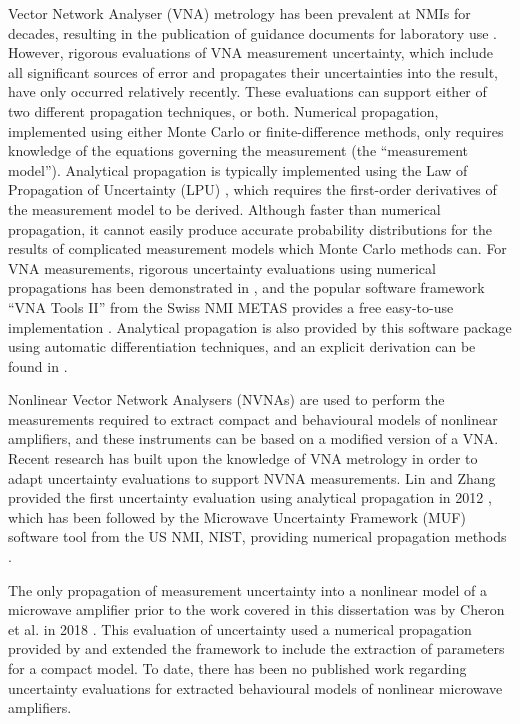 \documentclass[../thesis/thesis.tex]{subfiles}
\begin{document}
Vector Network Analyser (VNA) metrology has been prevalent at NMIs for decades, resulting in the publication of guidance documents for laboratory use \cite{EA_2000,EURAMET_2011}. However, rigorous evaluations of VNA measurement uncertainty, which include all significant sources of error and propagates their uncertainties into the result, have only occurred relatively recently. These evaluations can support either of two different propagation techniques, or both. Numerical propagation, implemented using either Monte Carlo or finite-difference methods, only requires knowledge of the equations governing the measurement (the ``measurement model''). Analytical propagation is typically implemented using the Law of Propagation of Uncertainty (LPU) \cite{GUM_2008}, which requires the first-order derivatives of the measurement model to be derived. Although faster than numerical propagation, it cannot easily produce accurate probability distributions for the results of complicated measurement models which Monte Carlo methods can. For VNA measurements, rigorous uncertainty evaluations using numerical propagations has been demonstrated in \cite{Hoffman_2007}, and the popular software framework ``VNA Tools II'' from the Swiss NMI METAS provides a free easy-to-use implementation \cite{VNATools}. Analytical propagation is also provided by this software package using automatic differentiation techniques, and an explicit derivation can be found in \cite{Lewandowski_2010B}.

Nonlinear Vector Network Analysers (NVNAs) are used to perform the measurements required to extract compact and behavioural models of nonlinear amplifiers, and these instruments can be based on a modified version of a VNA. Recent research has built upon the knowledge of VNA metrology in order to adapt uncertainty evaluations to support NVNA measurements. Lin and Zhang provided the first uncertainty evaluation using analytical propagation in 2012 \cite{Lin_2012}, which has been followed by the Microwave Uncertainty Framework (MUF) software tool from the US NMI, NIST, providing numerical propagation methods \cite{MUFWebsite,Avolio_2015}.

The only propagation of measurement uncertainty into a nonlinear model of a microwave amplifier prior to the work covered in this dissertation was by Cheron et al. in 2018 \cite{Cheron_2018}. This evaluation of uncertainty used a numerical propagation provided by \cite{MUFWebsite} and extended the framework to include the extraction of parameters for a compact model. To date, there has been no published work regarding uncertainty evaluations for extracted behavioural models of nonlinear microwave amplifiers.
\end{document}
